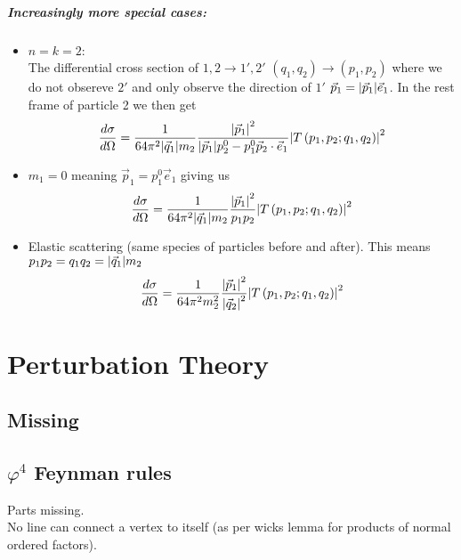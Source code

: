 \documentclass{report}
\begin{document}
\paragraph{Increasingly more special cases:}
\begin{itemize}
  \item $n = k = 2$:\\
    The differential cross section of  $1 , 2 \to 1',2'$ $\left( q_1,q_2 \right) \to \left( p_1,p_2 \right) $ where we do not obsereve $2'$ and only observe the direction of $1'$ $\vec{p}_1 = \abs{\vec{p}_1} \vec{e}_1$. In the rest frame of particle 2 we then get \[
    \frac{d\sigma}{d\Omega} = \frac{1}{64 \pi^2 \abs{\vec{q}_1} m_2 } \frac{\abs{\vec{p}_1} ^2}{\abs{\vec{p}_1} p_2^{0} - p_1^{0} \vec{p}_2 \cdot \vec{e}_1 } \abs{T\left( p_1,p_2;q_1,q_2 \right) } ^2
    \] 
  \item $m_1 = 0$ meaning $\vec{p}_1 = p_1^{0} \vec{e}_1$ giving us \[
    \frac{d\sigma}{d\Omega} = \frac{1}{64 \pi^2 \abs{\vec{q}_1} m_2 } \frac{\abs{\vec{p}_1} ^2}{p_1p_2} \abs{T\left( p_1,p_2;q_1,q_2 \right) } ^2
  \] 
\item Elastic scattering (same species of particles before and after). This means $p_1p_2 = q_1q_2 = \abs{\vec{q}_1} m_2$ \[
    \frac{d\sigma}{d\Omega} = \frac{1}{64 \pi^2 m_2^2 } \frac{\abs{\vec{p}_1} ^2}{\abs{\vec{q}_2} ^2} \abs{T\left( p_1,p_2;q_1,q_2 \right) } ^2

\] 
\end{itemize}

\chapter{Perturbation Theory}
\section{Missing}
\section{$\varphi^{4} $ Feynman rules}
Parts missing.\\
No line can connect a vertex to itself (as per wicks lemma for products of normal ordered factors).
\end{document}
